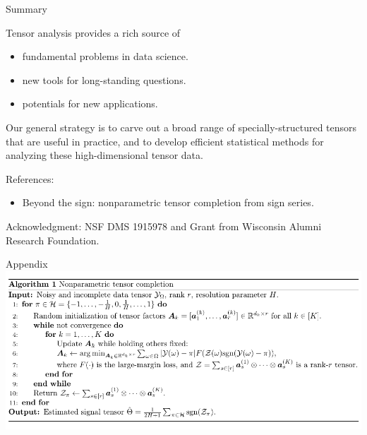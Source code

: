 \documentclass[10pt, mathserif]{beamer} %
\theoremstyle{definition}
\theoremstyle{plain}
\begin{document}
\begin{frame}{Summary}

Tensor analysis provides a rich source of
\begin{itemize}
\item fundamental problems in data science.
\item new tools for long-standing questions.
\item potentials for new applications.
\end{itemize}

\begin{block}{}
Our general strategy is to carve out a broad range of {\color{red}specially-structured tensors} that are useful in practice, and to develop efficient statistical methods for analyzing these high-dimensional tensor data.
\end{block}

References:
\begin{itemize}
\item {\color{blue}Beyond the sign: nonparametric tensor completion from sign series.} 
\end{itemize}
\vspace{.2cm}
Acknowledgment: {\small NSF DMS 1915978 and Grant from Wisconsin Alumni Research Foundation.}
\end{frame}



\appendix
\begin{frame}{Appendix}
    \includegraphics[width = \textwidth]{Figures/algorithm.pdf}
\end{frame}
\end{document}
